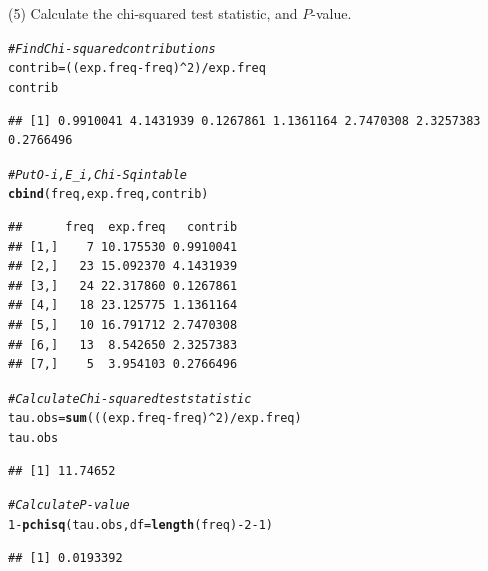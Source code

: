 \documentclass[t,xcolor=pdftex,dvipsnames,table]{beamer}\usepackage[]{graphicx}\usepackage[]{color}
\makeatletter
\newcommand{\hlnum}[1]{\textcolor[rgb]{0.686,0.059,0.569}{#1}}%
\newcommand{\hlcom}[1]{\textcolor[rgb]{0.678,0.584,0.686}{\textit{#1}}}%
\newcommand{\hlopt}[1]{\textcolor[rgb]{0,0,0}{#1}}%
\newcommand{\hlstd}[1]{\textcolor[rgb]{0.345,0.345,0.345}{#1}}%
\newcommand{\hlkwb}[1]{\textcolor[rgb]{0.69,0.353,0.396}{#1}}%
\newcommand{\hlkwc}[1]{\textcolor[rgb]{0.333,0.667,0.333}{#1}}%
\newcommand{\hlkwd}[1]{\textcolor[rgb]{0.737,0.353,0.396}{\textbf{#1}}}%
\newenvironment{kframe}{%
 \def\at@end@of@kframe{}%
 \ifinner\ifhmode%
  \def\at@end@of@kframe{\end{minipage}}%
  \begin{minipage}{\columnwidth}%
 \fi\fi%
 \def\FrameCommand##1{\hskip\@totalleftmargin \hskip-\fboxsep
 \colorbox{shadecolor}{##1}\hskip-\fboxsep
     \hskip-\linewidth \hskip-\@totalleftmargin \hskip\columnwidth}%
 \MakeFramed {\advance\hsize-\width
   \@totalleftmargin\z@ \linewidth\hsize
   \@setminipage}}%
 {\par\unskip\endMakeFramed%
 \at@end@of@kframe}
\newenvironment{knitrout}{}{} %
\makeatother
\begin{document}
\begin{frame}[fragile]{}
(5) Calculate the chi-squared test statistic, and $P$-value.
\begin{knitrout}
\color{fgcolor}\begin{kframe}
\begin{alltt}
\hlcom{#Find Chi-squared contributions}
\hlstd{contrib} \hlkwb{=} \hlstd{((exp.freq}\hlopt{-}\hlstd{freq)}\hlopt{^}\hlnum{2}\hlstd{)}\hlopt{/}\hlstd{exp.freq}
\hlstd{contrib}
\end{alltt}
\begin{verbatim}
## [1] 0.9910041 4.1431939 0.1267861 1.1361164 2.7470308 2.3257383 0.2766496
\end{verbatim}
\begin{alltt}
\hlcom{# Put O-i, E_i, Chi-Sq in table}
\hlkwd{cbind}\hlstd{(freq,exp.freq,contrib)}
\end{alltt}
\begin{verbatim}
##      freq  exp.freq   contrib
## [1,]    7 10.175530 0.9910041
## [2,]   23 15.092370 4.1431939
## [3,]   24 22.317860 0.1267861
## [4,]   18 23.125775 1.1361164
## [5,]   10 16.791712 2.7470308
## [6,]   13  8.542650 2.3257383
## [7,]    5  3.954103 0.2766496
\end{verbatim}
\end{kframe}
\end{knitrout}
\end{frame}

\begin{frame}[fragile]{}
\begin{knitrout}
\color{fgcolor}\begin{kframe}
\begin{alltt}
\hlcom{#Calculate Chi-squared test statistic}
\hlstd{tau.obs}\hlkwb{=}\hlkwd{sum}\hlstd{(((exp.freq}\hlopt{-}\hlstd{freq)}\hlopt{^}\hlnum{2}\hlstd{)}\hlopt{/}\hlstd{exp.freq)}
\hlstd{tau.obs}
\end{alltt}
\begin{verbatim}
## [1] 11.74652
\end{verbatim}
\begin{alltt}
\hlcom{#Calculate P-value}
\hlnum{1}\hlopt{-}\hlkwd{pchisq}\hlstd{(tau.obs,} \hlkwc{df}\hlstd{=}\hlkwd{length}\hlstd{(freq)}\hlopt{-}\hlnum{2}\hlopt{-}\hlnum{1}\hlstd{)}
\end{alltt}
\begin{verbatim}
## [1] 0.0193392
\end{verbatim}
\end{kframe}
\end{knitrout}
\end{frame}
\end{document}
